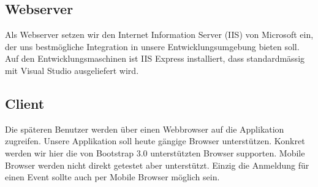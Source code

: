 		\subsection{Webserver}
		Als Webserver setzen wir den Internet Information Server (IIS) von Microsoft ein, der uns bestmögliche Integration in unsere Entwicklungsumgebung bieten soll. Auf den Entwicklungsmaschinen ist IIS Express installiert, dass standardmässig mit Visual Studio ausgeliefert wird.
		\subsection{Client}
		Die späteren Benutzer werden über einen Webbrowser auf die Applikation zugreifen. Unsere Applikation soll heute gängige Browser unterstützen. Konkret werden wir hier die von Bootstrap 3.0 unterstützten Browser supporten. Mobile Browser werden nicht direkt getestet aber unterstützt. Einzig die Anmeldung für einen Event sollte auch per Mobile Browser möglich sein.


